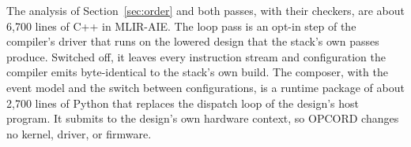 The analysis of Section~\ref{sec:order} and both passes, with their checkers, are about 6{,}700 lines of C++ in MLIR-AIE.
The loop pass is an opt-in step of the compiler's driver that runs on the lowered design that the stack's own passes produce.
Switched off, it leaves every instruction stream and configuration the compiler emits byte-identical to the stack's own build.
The composer, with the event model and the switch between configurations, is a runtime package of about 2{,}700 lines of Python that replaces the dispatch loop of the design's host program.
It submits to the design's own hardware context, so OPCORD changes no kernel, driver, or firmware.

